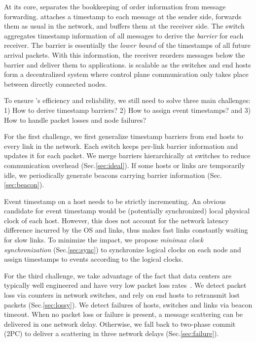 At its core, \sys separates the bookkeeping of order information from message forwarding.
\sys attaches a timestamp to each message at the sender side, forwards them as usual in the network, and buffers them at the receiver side.
The switch aggregates timestamp information of all messages to derive the \textit{barrier} for each receiver.
The barrier is essentially the \textit{lower bound} of the timestamps of all future arrival packets.
With this information, the receiver reorders messages below the barrier and deliver them to applications.
\sys is scalable as the switches and end hosts form a decentralized system where control plane communication only takes place between directly connected nodes.

To ensure \sys's efficiency and reliability, we still need to solve three main challenges: 1) How to derive timestamp barriers? 2) How to assign event timestamps? and 3) How to handle packet losses and node failures?

For the first challenge, we first generalize timestamp barriers from end hosts to every link in the network.
Each switch keeps per-link barrier information and updates it for each packet.
We merge barriers hierarchically at switches to reduce communication overhead (Sec.\ref{sec:ideal}).
If some hosts or links are temporarily idle, we periodically generate beacons carrying barrier information (Sec.\ref{sec:beacon}).


Event timestamp on a host needs to be strictly incrementing. An obvious candidate for event timestamp would be (potentially synchronized) local physical clock of each host. However, this does not account for the network latency difference incurred by the OS and links, thus makes fast links constantly waiting for slow links.
To minimize the impact, we propose \textit{minimax clock synchronization} (Sec.\ref{sec:sync}) to synchronize logical clocks on each node and assign timestamps to events according to the logical clocks.

For the third challenge, we take advantage of the fact that data centers are typically well engineered and have very low packet loss rates~\cite{ports2015designing}.
We detect packet loss via counters in network switches, and rely on end hosts to retransmit lost packets (Sec.\ref{sec:lossy}).
We detect failures of hosts, switches and links via beacon timeout.
When no packet loss or failure is present, a message scattering can be delivered in one network delay. Otherwise, we fall back to two-phase commit (2PC) to deliver a scattering in three network delays (Sec.\ref{sec:failure}).

